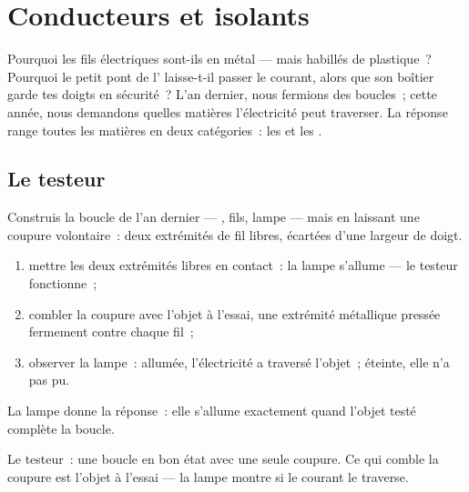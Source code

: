 \chapter{Conducteurs et isolants}\label{ch:g4:conductors-insulators}

Pourquoi les fils électriques sont-ils en métal --- mais habillés de
plastique~? Pourquoi le petit pont de l' laisse-t-il
passer le courant, alors que son boîtier garde tes doigts en
sécurité~? L'an dernier, nous fermions des boucles~; cette année,
nous demandons quelles matières l'électricité peut traverser. La
réponse range toutes les matières en deux catégories~: les
 et les .

\section{Le testeur}

\begin{method}\label{met:g4:conductors-insulators:tester}
Construis la boucle de l'an dernier --- , fils, lampe --- mais en
laissant une coupure volontaire~: deux extrémités de fil libres,
écartées d'une largeur de doigt.
\begin{enumerate}
  \item mettre les deux extrémités libres en contact~: la lampe
        s'allume --- le testeur fonctionne~;
  \item combler la coupure avec l'objet à l'essai, une extrémité
        métallique pressée fermement contre chaque fil~;
  \item observer la lampe~: allumée, l'électricité a traversé
        l'objet~; éteinte, elle n'a pas pu.
\end{enumerate}
La lampe donne la réponse~: elle s'allume exactement quand l'objet
testé complète la boucle.
\end{method}

\begin{omfigure}

{\small Le testeur~: une boucle en bon état avec une seule coupure.
Ce qui comble la coupure est l'objet à l'essai --- la lampe montre si
le courant le traverse.}
\end{omfigure}

